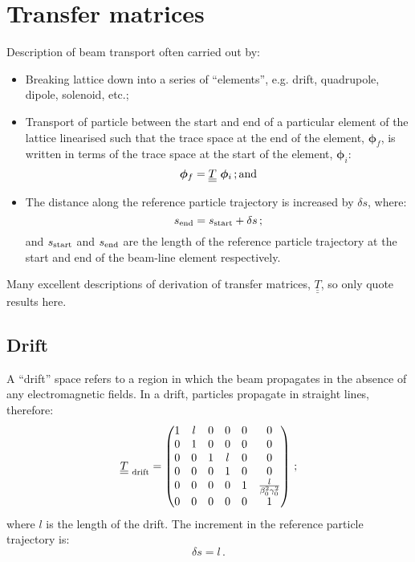 \graphicspath{ {04-TransferMatrices/Figures/} }

\section{Transfer matrices}

Description of beam transport often carried out by:
\begin{itemize}
  \item Breaking lattice down into a series of ``elements'',
    e.g. drift, quadrupole, dipole, solenoid, etc.;
  \item Transport of particle between the start and end of a
    particular element of the lattice linearised such that the trace
    space at the end of the element, $\bm{\phi}_f$, is written in
    terms of the trace space at the start of the element,
    $\bm{\phi}_i$:
    \begin{equation}
      \bm{\phi}_f = \underline{\underline{T}} ~ \bm{\phi}_i \,
      {\rm ; and}
    \end{equation}
  \item The distance along the reference particle trajectory is
    increased by $\delta s$, where:
    \begin{equation}
      s_{\rm end} = s_{\rm start} + \delta s \, ;
    \end{equation}
    and $s_{\rm start}$ and $s_{\rm end}$ are the length of the
    reference particle trajectory at the start and end of the 
    beam-line element respectively.
\end{itemize}
Many excellent descriptions of derivation of transfer matrices,
$\underline{\underline{T}}$, so only quote results here.

\subsection{Drift}

A ``drift'' space refers to a region in which the beam propagates in
the absence of any electromagnetic fields.
In a drift, particles propagate in straight lines, therefore:
\begin{equation}
  \underline{\underline{T}}_{\rm~drift} =
        \begin{pmatrix}
          1 & l & 0 & 0 & 0 &                             0 \\
          0 & 1 & 0 & 0 & 0 &                             0 \\
          0 & 0 & 1 & l & 0 &                             0 \\
          0 & 0 & 0 & 1 & 0 &                             0 \\
          0 & 0 & 0 & 0 & 1 & \frac{l}{\beta_0^2 \gamma_0^2} \\
          0 & 0 & 0 & 0 & 0 &                             1
        \end{pmatrix} \, ; 
\end{equation}
where $l$ is the length of the drift.
The increment in the reference particle trajectory is:
\begin{equation}
  \delta s = l \, .
\end{equation}

